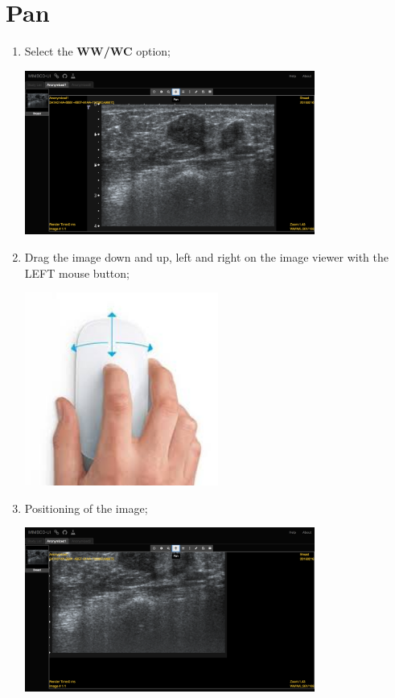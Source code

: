 \documentclass{tufte-book} %
\begin{document}
\chapter{Pan}

\begin{enumerate}

\item Select the \textbf{WW/WC} option;

\begin{center}
\includegraphics[width=0.75\textwidth]{graphics/anon1_pan_off.png}
\end{center}

\item Drag the image down and up, left and right on the image viewer with the LEFT mouse button;

\begin{center}
\includegraphics[width=0.50\textwidth]{graphics/mouse-all.png}
\end{center}

\item Positioning of the image;

\begin{center}
\includegraphics[width=0.75\textwidth]{graphics/anon1_pan_on.png}
\end{center}

\end{enumerate}
\end{document}
